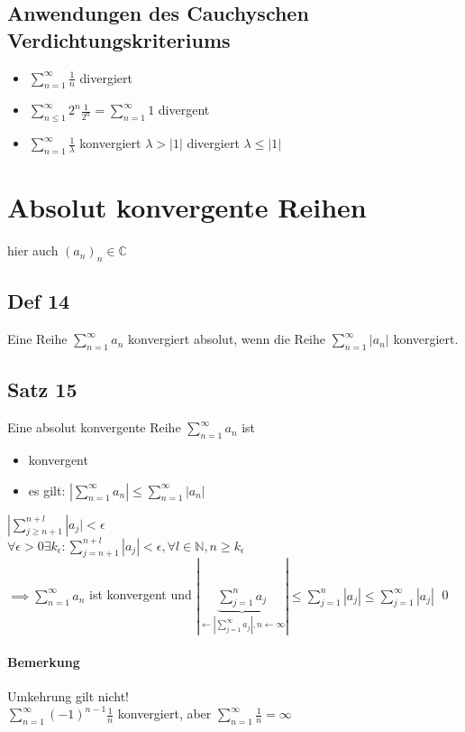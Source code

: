 \documentclass[fleqn]{scrbook}
\newcommand{\sumOI}{\sum_{n=1}^{\infty}}
\renewenvironment{proof}{{\bfseries Beweis }}{\qed}
\begin{document}
\subsection{Anwendungen des Cauchyschen Verdichtungskriteriums}
\begin{itemize}
 \item $\sumOI \frac{1}{n}$ divergiert
 \item $\sum_{n\le1}^{\infty} 2^n \frac{1}{2^n} = \sumOI 1$ divergent
 \item $\sumOI \frac{1}{\lambda} $ konvergiert $\lambda > |1|$ divergiert $\lambda \le |1|$
\end{itemize}

\section{Absolut konvergente Reihen}
hier auch $(a_n)_n \in \mathbb{C}$
\subsection{Def 14}
Eine Reihe $\sumOI a_n$ konvergiert absolut, wenn die Reihe $\sumOI |a_n| $ konvergiert.

\subsection{Satz 15}
Eine absolut konvergente Reihe $\sumOI a_n$ ist 
\begin{itemize}
 \item konvergent
 \item es gilt: $|\sumOI a_n| \le \sumOI |a_n| $
\end{itemize}
\begin{proof}
  $|\sum_{j\geq n+1}^{n+l} |a_j| < \epsilon$\\
  $\forall \epsilon > 0 \exists k_\epsilon : \sum_{j=n+1}^{n+l} |a_j| < \epsilon , \forall l \in \mathbb{N}, n \geq k_\epsilon$\\
  $\implies \sumOI a_n$ ist konvergent und $|\underbrace{\sum_{j=1}^n a_j}_{\leftarrow |\sum_{j=1}^\infty a_j|, n\leftarrow \infty}| \leq \sum_{j=1}^n |a_j| \leq \sum_{j=1}^\infty |a_j|$
\end{proof}

\paragraph{Bemerkung} Umkehrung gilt nicht!\\
$\sumOI (-1)^{n-1} \frac{1}{n}$ konvergiert, aber $\sumOI \frac{1}{n} = \infty$
\end{document}
